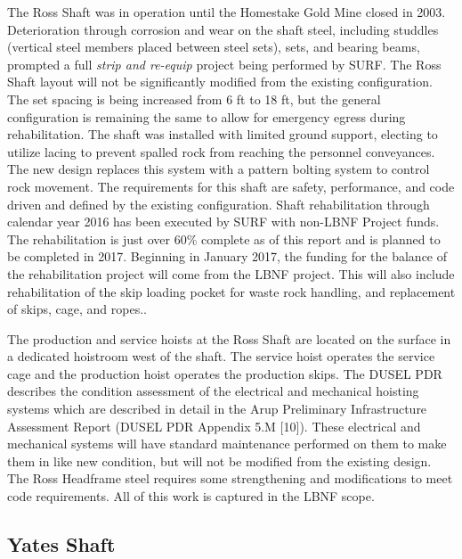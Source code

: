 The Ross Shaft was in operation until the Homestake Gold Mine closed in 2003. Deterioration through corrosion and wear on the shaft steel, including studdles (vertical steel members placed between steel sets), sets, and bearing beams, prompted a full \textit{strip and re-equip} project being performed by  SURF. The Ross Shaft layout will not be significantly modified from the existing configuration. The set spacing is being increased from 6 ft to 18 ft, but the general configuration is remaining the same to allow for emergency egress during rehabilitation. The shaft was installed with limited ground support, electing to utilize lacing to prevent spalled rock from reaching the personnel conveyances. The new design replaces this system with a pattern bolting system to control rock movement. The requirements for this shaft are safety, performance, and code driven and defined by the existing configuration. Shaft rehabilitation through calendar year 2016 has been executed by SURF with non-LBNF Project funds. The rehabilitation is just over 60\% complete as of this report and is planned to be completed in 2017. Beginning in January 2017, the funding for the balance of the rehabilitation project will come from the LBNF project.  This will also include rehabilitation of the skip loading pocket for waste rock handling, and replacement of skips, cage, and ropes..

The production and service hoists at the Ross Shaft are located on the surface in a dedicated hoistroom west of the shaft. The service hoist operates the service cage and the production hoist operates the production skips. The DUSEL PDR describes the condition assessment of the electrical and mechanical hoisting systems which are described in detail in the Arup Preliminary Infrastructure Assessment Report (DUSEL PDR Appendix 5.M [10]). These electrical and mechanical systems will have standard maintenance performed on them to make them in like new condition, but will not be modified from the existing design. The Ross Headframe steel requires some strengthening and modifications to meet code requirements. All of this work is captured in the LBNF scope.

\subsection{Yates Shaft}
\label{sec:fscf-und-shafts-yates}

